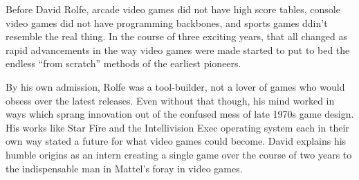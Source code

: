 Before David Rolfe, arcade video games did not have high score tables, console video games did not have programming backbones, and sports games ddin’t resemble the real thing. In the course of three exciting years, that all changed as rapid advancements in the way video games were made started to put to bed the endless “from scratch” methods of the earliest pioneers.

By his own admission, Rolfe was a tool-builder, not a lover of games who would obsess over the latest releases. Even without that though, his mind worked in ways which sprang innovation out of the confused mess of late 1970s game design. His works like Star Fire and the Intellivision Exec operating system each in their own way stated a future for what video games could become. David explains his humble origins as an intern creating a single game over the course of two years to the indispensable man in Mattel’s foray in video games.

\noindent\makebox[\linewidth]{\rule{\paperwidth}{0.4pt}}
